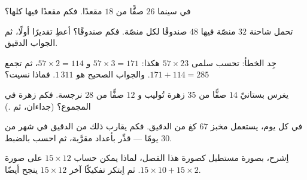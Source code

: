 \begin{exercise}[$\star$]\label{exo:g4:mult:6}
في سينما $26$ صفًّا من $18$ مقعدًا. فكم مقعدًا فيها كلها؟
\end{exercise}

\begin{exercise}[$\star$]\label{exo:g4:mult:7}
تحمل شاحنة $32$ منصّة فيها $48$ صندوقًا لكل منصّة. فكم صندوقًا؟
أعطِ تقديرًا أولًا، ثم الجواب الدقيق.
\end{exercise}

\begin{exercise}[$\star$]\label{exo:g4:mult:8}
جِد الخطأ: تحسب سلمى $57 \times 23$ هكذا:
$57 \times 3 = 171$ و $57 \times 2 = 114$، ثم تجمع
$171 + 114 = 285$. والجواب الصحيح هو $1\,311$. فماذا
نسيت؟
\end{exercise}

\begin{exercise}[$\star\star$]\label{exo:g4:mult:9}
يغرس بستانيّ $14$ صفًّا من $35$ زهرة تُوليب و $12$ صفًّا من $28$
نرجسة. فكم زهرة في المجموع؟ (جداءان، ثم .)
\end{exercise}

\begin{exercise}[$\star\star$]\label{exo:g4:mult:10}
في كل يوم، يستعمل مخبز $67$ كغ من الدقيق. فكم يقارب ذلك من
الدقيق في شهر من $30$ يومًا --- قدِّر بأعداد مقرَّبة، ثم احسب
بالضبط.
\end{exercise}

\begin{exercise}[$\star\star$]\label{exo:g4:mult:11}
اِشرح، بصورة مستطيل كصورة هذا الفصل، لماذا يمكن حساب
$15 \times 12$ على صورة $15 \times 10 + 15 \times 2$.
ثم اِبتكر تفكيكًا آخر  $15 \times 12$ ينجح أيضًا.
\end{exercise}
